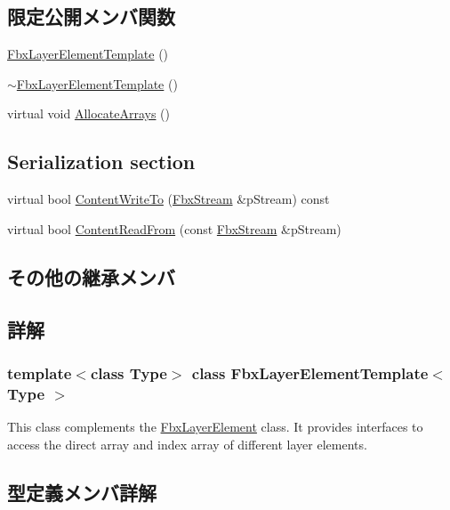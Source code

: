 \subsection*{限定公開メンバ関数}
\begin{DoxyCompactItemize}
\item 
\hyperlink{class_fbx_layer_element_template_a6a71830fc5470ac678678306dea4b550}{Fbx\+Layer\+Element\+Template} ()
\item 
\hyperlink{class_fbx_layer_element_template_a3d88304159752296aece120bb005e546}{$\sim$\+Fbx\+Layer\+Element\+Template} ()
\item 
virtual void \hyperlink{class_fbx_layer_element_template_aa6d432c5865fcda1b58376119f1fcaa8}{Allocate\+Arrays} ()
\end{DoxyCompactItemize}
\subsection*{Serialization section}
\begin{DoxyCompactItemize}
\item 
virtual bool \hyperlink{class_fbx_layer_element_template_a035bb7adbe8edf5a861d6154c7ebeb8b}{Content\+Write\+To} (\hyperlink{class_fbx_stream}{Fbx\+Stream} \&p\+Stream) const
\item 
virtual bool \hyperlink{class_fbx_layer_element_template_a19424f43272601bf018b8a0ba843b094}{Content\+Read\+From} (const \hyperlink{class_fbx_stream}{Fbx\+Stream} \&p\+Stream)
\end{DoxyCompactItemize}
\subsection*{その他の継承メンバ}


\subsection{詳解}
\subsubsection*{template$<$class Type$>$\newline
class Fbx\+Layer\+Element\+Template$<$ Type $>$}

This class complements the \hyperlink{class_fbx_layer_element}{Fbx\+Layer\+Element} class. It provides interfaces to access the direct array and index array of different layer elements. 

\subsection{型定義メンバ詳解}
\mbox{\label{class_fbx_layer_element_template_a24cfd1d513a54140bde996ccfa2bf2b6}} 
